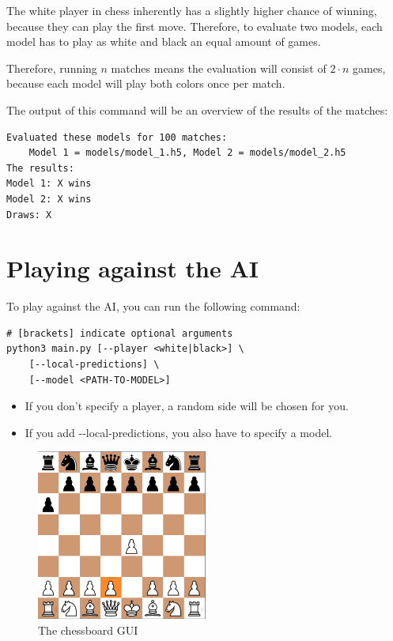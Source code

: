 \documentclass{article}
\begin{document}
The white player in chess inherently has a slightly higher chance of winning,
because they can play the first move. Therefore, to evaluate two models, 
each model has to play as white and black an equal amount of games.

Therefore, running $n$ matches means the evaluation will consist of $2\cdot n$ games, because
each model will play both colors once per match.

The output of this command will be an overview of the results of the matches:

\begin{verbatim}
Evaluated these models for 100 matches: 
    Model 1 = models/model_1.h5, Model 2 = models/model_2.h5 
The results: 
Model 1: X wins
Model 2: X wins
Draws: X
\end{verbatim}

\section{Playing against the AI}

To play against the AI, you can run the following command:

\begin{verbatim}
# [brackets] indicate optional arguments
python3 main.py [--player <white|black>] \
    [--local-predictions] \
    [--model <PATH-TO-MODEL>]
\end{verbatim}


\begin{itemize}
    \item If you don't specify a player, a random side will be chosen for you.
    \item If you add -{}-local-predictions, you also have to specify a model.
\end{itemize}

\begin{figure}[H]
    \centering
    \includegraphics[width=0.5\textwidth]{img/chessboard-gui.png}
    \caption{The chessboard GUI}
\end{figure}
\end{document}
